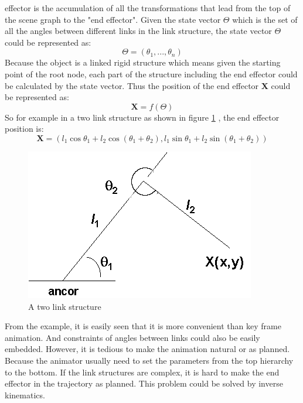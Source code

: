   effector is the accumulation of all the transformations that lead
  from the top of the scene graph to the "end effector"\cite{alan3D}. Given the state
  vector $\Theta{}$ which is the set of all the angles between different links in the link structure,
  the state vector $\Theta{}$ could be represented as\cite{alan3D}:
  \begin{equation}
  \Theta{}=(\theta_1,...,\theta_n)  
  \end{equation}
Because the object is a linked rigid structure which means given the starting point of the root node, each part of the structure including the end effector could be calculated by the state vector. Thus the position of the end effector \textbf{X} could be represented as\cite{alan3D}:
\begin{equation}
\mathbf{X} = f(\Theta)        
\end{equation}
So for example in a two link structure as shown in figure \ref{fig:twolink} , the end effector position is\cite{alan3D}:
\begin{equation}
\label{eq:1}
\mathbf{X}=(l_1\cos\theta_1+l_2\cos(\theta_1+\theta_2),l_1\sin\theta_1+l_2\sin(\theta_1+\theta_2))  
\end{equation}
\begin{figure}[ht!]
\centering
\includegraphics[height=5 cm]{figures/twolink.png}
\caption{A two link structure \protect\cite{linkpic}}
\label{fig:twolink}
\end{figure}
From the example, it is easily seen that it is more convenient than key frame animation. And constraints of angles between links could also be easily embedded. However, it is tedious to make the animation natural or as planned. Because the animator usually need to set the parameters from the top hierarchy to the bottom. If the link structures are complex, it is hard to make the end effector in the trajectory as planned\cite{alan3D}. This problem could be solved by inverse kinematics.
